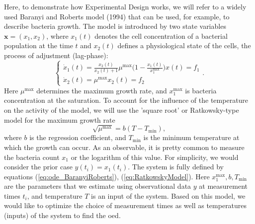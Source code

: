 \documentclass[10pt,A4paper]{article}
\newcommand{\mbx}{\mathbf{x}}
\begin{document}
Here, to demonstrate how Experimental Design works, we will refer to a widely used Baranyi and Roberts model (1994) that can be used, for example, to describe bacteria growth.
The model is introduced by two state variables $\mbx = (x_1, x_2)$, where $x_1(t)$ denotes the cell concentration of a bacterial population at the time $t$ and $x_2(t)$ defines a physiological state of the cells, the process of adjustment (lag-phase):
\begin{equation}
    \begin{cases}
    \dot x_1(t) = \frac{x_2(t)}{x_2(t) + 1} \mu^\text{max} \big(1 - \frac{x_1(t)}{x_1^\text{max}}\big) x(t)  = f_1 \\
    \dot x_2(t) = \mu^\text{max}  x_2(t) = f_2
    \end{cases}.
    \label{eq:ode_BaranyiRoberts}
\end{equation}
Here $\mu^\text{max}$ determines the maximum growth rate, and $x_1^\text{max}$ is bacteria concentration at the saturation. 
To account for the influence of the temperature on the activity of the model, we will use the 'square root' or Ratkowsky-type model for the maximum growth rate
\begin{equation}
    \sqrt{\mu^\text{max}} = b (T - T_\text{min}),
    \label{eq:RatkowskyModel}
\end{equation} 
where $b$ is the regression coefficient, and $T_\text{min}$ is the minimum temperature at which the growth can occur.
As an observable, it is pretty common to measure the bacteria count $x_1$ or the logarithm of this value. 
For simplicity, we would consider the prior case $y(t_i) = x_1(t_i)$.
The system is fully defined by equations (\ref{eq:ode_BaranyiRoberts}), (\ref{eq:RatkowskyModel}).
Here $x_1^\text{max}, b, T_\text{min}$ are the parameters that we estimate using observational data $y$ at measurement times $t_i$, and temperature $T$ is an input of the system.
Based on this model, we would like to optimize the choice of measurement times as well as temperatures (inputs) of the system to find the \acl{oed}.
%
\end{document}
